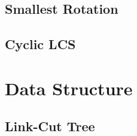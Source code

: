 \documentclass[a4paper,10pt,twocolumn,oneside]{article}
\begin{document}
\subsection{Smallest Rotation}
%


%

\subsection{Cyclic LCS}


\section{Data Structure}

%

\subsection{Link-Cut Tree}


%

%

%

%
\end{document}
